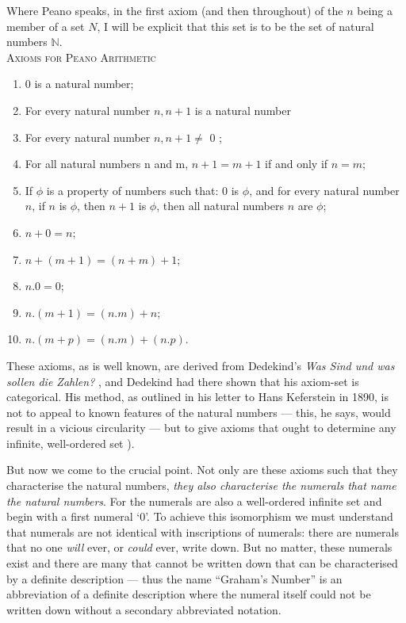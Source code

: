 \documentclass[11pt,oneside,a4paper]{article}
\begin{document}
Where Peano speaks, in the first axiom (and then throughout) of the $n$ being a member of a set $N$, I will be explicit that this set is to be the set of natural numbers $\mathbb{N}$. \\

\noindent\textsc{Axioms for Peano Arithmetic}

\begin{enumerate}[label=P\Roman* :]

  \item 0 is a natural number;
  
  \item For every natural number $n, n + 1$ is a natural number
  
  \item For every natural number $n, n + 1 \neq$ 0 ;
  
  \item For all natural numbers n and m, $n + 1 = m + 1$ if and only if $n = m$;
  
  \item If $\phi$ is a property of numbers such that: 0 is $\phi$, and for every natural number $n$, if $n$ is $\phi$, then $n + 1$ is $\phi$, then all natural numbers $n$ are $\phi$;
  
  \item $n + 0 = n$;
  
  \item $n + (m + 1) = (n + m) + 1$;
  
  \item $n . 0 = 0$;
  
  \item $n . (m + 1) =  (n . m) + n$;
  
  \item $n . (m + p) = (n . m) + (n . p)$.\\
\end{enumerate}

These axioms, as is well known, are derived from Dedekind's \textit{Was Sind und was sollen die Zahlen?} \parencite*{dedekind_was_1888}, and Dedekind had there shown that his axiom-set is categorical. His method, as outlined in his letter to Hans Keferstein in 1890, is not to appeal to known features of the natural numbers --- this, he says, would result in a vicious circularity --- but to give axioms that ought to determine any infinite, well-ordered set \parencite{van_heijenoort_frege_1967}).

But now we come to the crucial point. Not only are these axioms such that they characterise the natural numbers, \emph{they also characterise the numerals that \emph{name} the natural numbers}. For the numerals are also a well-ordered infinite set and begin with a first numeral `0'. To achieve this isomorphism we must understand that numerals are not identical with inscriptions of numerals: there are numerals that no one \textit{will} ever, or \textit{could} ever, write down. But no matter, these numerals exist and there are many that cannot be written down that can be characterised by a definite description --- thus the name ``Graham's Number'' is an abbreviation of a definite description where the numeral itself could not be written down without a secondary abbreviated notation. 
\end{document}
